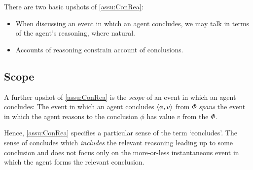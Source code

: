\begin{note}
  There are two basic upshots of \autoref{assu:ConRea}:

  \begin{itemize}[noitemsep]
  \item
    When discussing an event in which an agent concludes, we may talk in terms of the agent's reasoning, where natural.
  \item
    Accounts of reasoning constrain account of conclusions.
  \end{itemize}
\end{note}

\subsection{Scope}
\label{sec:scope}

\begin{note}
  A further upshot of \autoref{assu:ConRea} is the \emph{scope} of an event in which an agent concludes:
  The event in which an agent concludes \(\langle \phi, v \rangle\) from \(\Phi\) \emph{spans} the event in which the agent reasons to the conclusion \(\phi\) has value \(v\) from the \pool{} \(\Phi\).

  Hence, \autoref{assu:ConRea} specifies a particular sense of the term `concludes'.
  The sense of concludes which \emph{includes} the relevant reasoning leading up to some conclusion and does not focus only on the more-or-less instantaneous event in which the agent forms the relevant conclusion.
\end{note}

